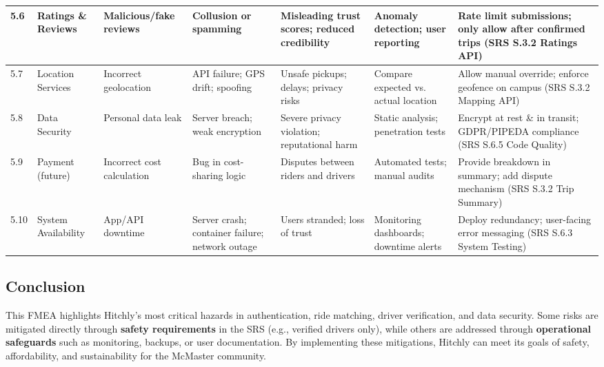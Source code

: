 \documentclass{article}
\begin{document}
\begin{longtable}{|p{0.5cm}|p{2cm}|p{2cm}|p{2cm}|p{2cm}|p{2cm}|p{2cm}|}
5.6 & Ratings \& Reviews & Malicious/fake reviews & Collusion or spamming & Misleading trust scores; reduced credibility & Anomaly detection; user reporting & Rate limit submissions; only allow after confirmed trips (SRS S.3.2 Ratings API) \\ \hline

5.7 & Location Services & Incorrect geolocation & API failure; GPS drift; spoofing & Unsafe pickups; delays; privacy risks & Compare expected vs. actual location & Allow manual override; enforce geofence on campus (SRS S.3.2 Mapping API) \\ \hline

5.8 & Data Security & Personal data leak & Server breach; weak encryption & Severe privacy violation; reputational harm & Static analysis; penetration tests & Encrypt at rest \& in transit; GDPR/PIPEDA compliance (SRS S.6.5 Code Quality) \\ \hline

5.9 & Payment (future) & Incorrect cost calculation & Bug in cost-sharing logic & Disputes between riders and drivers & Automated tests; manual audits & Provide breakdown in summary; add dispute mechanism (SRS S.3.2 Trip Summary) \\ \hline

5.10 & System Availability & App/API downtime & Server crash; container failure; network outage & Users stranded; loss of trust & Monitoring dashboards; downtime alerts & Deploy redundancy; user-facing error messaging (SRS S.6.3 System Testing) \\ \hline


\end{longtable}
\endgroup



\subsection{Conclusion}
This FMEA highlights Hitchly’s most critical hazards in authentication, ride matching,
driver verification, and data security. Some risks are mitigated directly through
\textbf{safety requirements} in the SRS (e.g., verified drivers only), while others are addressed
through \textbf{operational safeguards} such as monitoring, backups, or user documentation.
By implementing these mitigations, Hitchly can meet its goals of safety, affordability,
and sustainability for the McMaster community.

\end{document}
